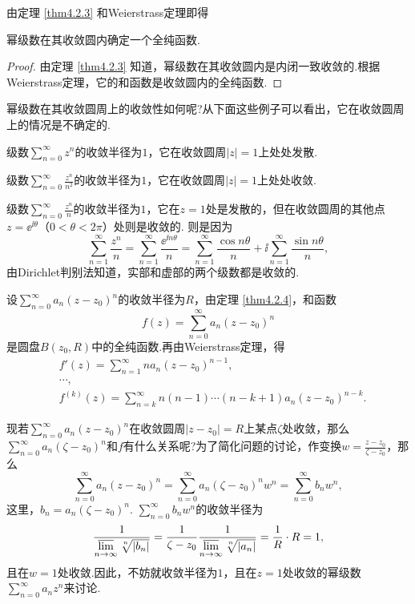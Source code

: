 由定理 \ref{thm4.2.3} 和Weierstrass定理即得
\begin{theorem}\label{thm4.2.4}
幂级数在其收敛圆内确定一个全纯函数.
\end{theorem}
\begin{proof}
由定理 \ref{thm4.2.3} 知道，幂级数在其收敛圆内是内闭一致收敛的.根据Weierstrass定理，它的和函数是收敛圆内的全纯函数.
\end{proof}

幂级数在其收敛圆周上的收敛性如何呢?从下面这些例子可以看出，它在收敛圆周上的情况是不确定的.

\begin{example}\label{exam4.2.5}
级数$\sum_{n=0}^\infty z^n$的收敛半径为$1$，它在收敛圆周$|z|=1$上处处发散.
\end{example}
\begin{example}\label{exam4.2.6}
级数$\sum_{n=0}^\infty \frac{z^n}{n^2}$的收敛半径为$1$，它在收敛圆周$|z|=1$上处处收敛.
\end{example}
\begin{example}
级数$\sum_{n=0}^\infty \frac{z^n}{n}$的收敛半径为$1$，它在$z=1$处是发散的，但在收敛圆周的其他点$z=\ee^{\ii\theta}$（$0<\theta<2\pi$）处则是收敛的. 则是因为
\[\sum_{n=1}^\infty\frac{z^n}n=\sum_{n=1}^\infty \frac{\ee^{\ii n\theta}}n=\sum_{n=1}^\infty\frac{\cos n\theta}n+\ii\sum_{n=1}^\infty\frac{\sin n\theta}n,\]
由Dirichlet判别法知道，实部和虚部的两个级数都是收敛的.
\end{example}

设$\sum_{n=0}^\infty a_n(z-z_0)^n$的收敛半径为$R$，由定理 \ref{thm4.2.4}，和函数
\[f(z)=\sum_{n=0}^\infty a_n(z-z_0)^n\]
是圆盘$B(z_0,R)$中的全纯函数.再由Weierstrass定理，得
\begin{align*}
&f'(z)=\sum_{n=1}^\infty na_n(z-z_0)^{n-1},\\
&\cdots,\\
&f^{(k)}(z)=\sum_{n=k}^\infty n(n-1)\cdots(n-k+1)a_n(z-z_0)^{n-k}.
\end{align*}

现若$\sum_{n=0}^\infty a_n(z-z_0)^n$在收敛圆周$|z-z_0|=R$上某点$\zeta$处收敛，那么$\sum_{n=0}^\infty a_n(\zeta-z_0)^n$和$f$有什么关系呢?为了简化问题的讨论，作变换$w=\frac{z-z_0}{\zeta-z_0}$，那么
\[\sum_{n=0}^\infty a_n(z-z_0)^n=\sum_{n=0}^\infty a_n(\zeta-z_0)^nw^n=\sum_{n=0}^\infty b_nw^n,\]
这里，$b_n=a_n(\zeta-z_0)^n$. $\sum_{n=0}^\infty b_nw^n$的收敛半径为
\[\frac1{\varlimsup\limits_{n\to\infty}\sqrt[\leftroot{-1}\uproot{2}n]{|b_n|}}
=\frac1{\zeta-z_0}\frac1{\varlimsup\limits_{n\to\infty}\sqrt[\leftroot{-1}
\uproot{2}n]{|a_n|}}=\frac1R\cdot R=1,\]
且在$w=1$处收敛.因此，不妨就收敛半径为$1$，且在$z=1$处收敛的幂级数$\sum_{n=0}^\infty a_nz^n$来讨论.

